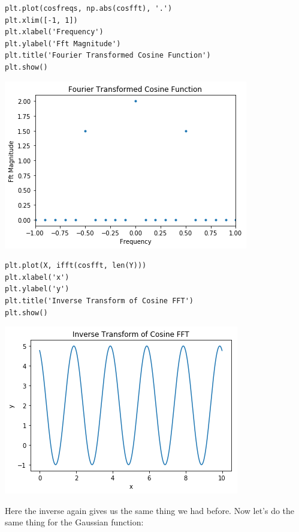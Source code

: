 \documentclass[11pt]{article}
\begin{document}
\begin{verbatim}
plt.plot(cosfreqs, np.abs(cosfft), '.')
plt.xlim([-1, 1])
plt.xlabel('Frequency')
plt.ylabel('Fft Magnitude')
plt.title('Fourier Transformed Cosine Function')
plt.show()
\end{verbatim}

\includegraphics[width=.9\linewidth]{./obipy-resources/17087UWK.png}

\begin{verbatim}
plt.plot(X, ifft(cosfft, len(Y)))
plt.xlabel('x')
plt.ylabel('y')
plt.title('Inverse Transform of Cosine FFT')
plt.show()
\end{verbatim}

\includegraphics[width=.9\linewidth]{./obipy-resources/17087vd1.png}

Here the inverse again gives us the same thing we had before. Now let's do the
same thing for the Gaussian function:
\end{document}
